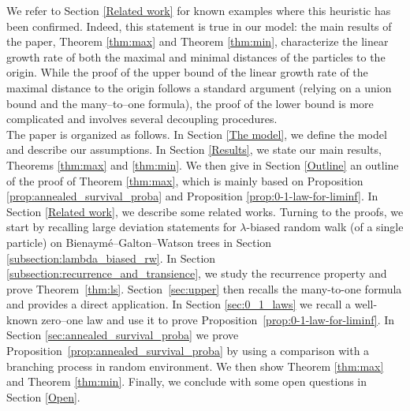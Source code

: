 \documentclass[11 pt]{article}
\theoremstyle{definition}
\numberwithin{equation}{section}
\begin{document}
We refer to Section \ref{Related work} for known examples where this heuristic has been confirmed.
Indeed, this statement is true in our model: the main results of the paper, Theorem \ref{thm:max} and Theorem \ref{thm:min}, characterize the linear growth rate of both the maximal and minimal distances of the particles to the origin. While the proof of the upper bound of the linear growth rate of the maximal distance to the origin follows a standard argument (relying on a union bound and the many--to--one formula), the proof of the lower bound is more complicated and involves several decoupling procedures.\\
\noindent
The paper is organized as follows. In Section \ref{The model}, we define the model and describe our assumptions. In Section \ref{Results}, we state our main results, Theorems \ref{thm:max} and \ref{thm:min}. We then give in Section \ref{Outline} an outline of the proof of Theorem \ref{thm:max}, which is mainly based on Proposition \ref{prop:annealed_survival_proba} and Proposition \ref{prop:0-1-law-for-liminf}. In Section \ref{Related work}, we describe some related works. Turning to the proofs, we start by recalling large deviation statements for $\lambda$-biased random walk (of a single particle) on Bienaymé--Galton--Watson trees in 
Section \ref{subsection:lambda_biased_rw}. 
In Section \ref{subsection:recurrence_and_transience}, we study the recurrence property and prove Theorem~\ref{thm:ls}. Section~\ref{sec:upper} then recalls the many-to-one formula and provides a direct application.
In Section \ref{sec:0_1_laws} we recall a well-known zero--one law and use it to prove Proposition~\ref{prop:0-1-law-for-liminf}. 
In Section \ref{sec:annealed_survival_proba} we prove Proposition~\ref{prop:annealed_survival_proba} by using a comparison with a branching process in random environment.
We then show Theorem \ref{thm:max} and Theorem \ref{thm:min}. Finally, we conclude with some open questions in Section \ref{Open}.
\end{document}
